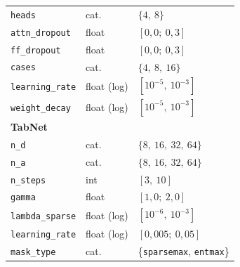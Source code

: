 \begin{table}[htbp]
\begin{tabular}{lll}
\texttt{heads}          & cat.  & $\{4,\ 8\}$ \\
\texttt{attn\_dropout}  & float & $[0{,}0;\ 0{,}3]$ \\
\texttt{ff\_dropout}    & float & $[0{,}0;\ 0{,}3]$ \\
\texttt{cases}          & cat.  & $\{4,\ 8,\ 16\}$ \\
\texttt{learning\_rate} & float (log) & $[10^{-5},\ 10^{-3}]$ \\
\texttt{weight\_decay}  & float (log) & $[10^{-5},\ 10^{-3}]$ \\
\midrule
\multicolumn{3}{l}{\textbf{TabNet}} \\
\texttt{n\_d}           & cat.  & $\{8,\ 16,\ 32,\ 64\}$ \\
\texttt{n\_a}           & cat.  & $\{8,\ 16,\ 32,\ 64\}$ \\
\texttt{n\_steps}       & int   & $[3,\ 10]$ \\
\texttt{gamma}          & float & $[1{,}0;\ 2{,}0]$ \\
\texttt{lambda\_sparse} & float (log) & $[10^{-6},\ 10^{-3}]$ \\
\texttt{learning\_rate} & float (log) & $[0{,}005;\ 0{,}05]$ \\
\texttt{mask\_type}     & cat.  & \{\texttt{sparsemax},
  \texttt{entmax}\} \\
\bottomrule
\end{tabular}
\end{table}

